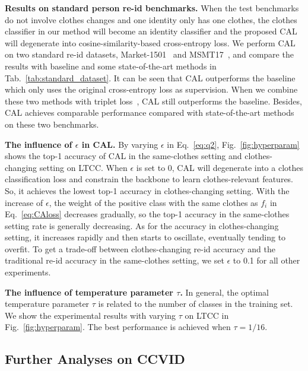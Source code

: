 \documentclass[10pt,twocolumn,letterpaper]{article}
\begin{document}
\medskip
\noindent
\textbf{Results on standard person re-id benchmarks.}
When the test benchmarks do not involve clothes changes and one identity only has one clothes, the clothes classifier in our method will become an identity classifier and the proposed CAL will degenerate into cosine-similarity-based cross-entropy loss. 
We perform CAL on two standard re-id datasets, \ie Market-1501~\cite{Zheng2015Scalable} and MSMT17~\cite{MSMT17}, and compare the results with baseline and some state-of-the-art methods in Tab.~\ref{tab:standard_dataset}. 
It can be seen that CAL outperforms the baseline which only uses the original cross-entropy loss as supervision. 
When we combine these two methods with triplet loss~\cite{Hermans2017In}, CAL still outperforms the baseline.
Besides, CAL achieves comparable performance compared with state-of-the-art methods on these two benchmarks.


\medskip
\noindent
\textbf{The influence of $\epsilon$ in CAL.}
By varying $\epsilon$ in Eq.~\eqref{eq:q2}, Fig.~\ref{fig:hyperparam} shows the top-1 accuracy of CAL in the same-clothes setting and clothes-changing setting on LTCC.
When $\epsilon$ is set to 0, CAL will degenerate into a clothes classification loss and constrain the backbone to learn clothes-relevant features.
So, it achieves the lowest top-1 accuracy in clothes-changing setting.
With the increase of $\epsilon$, the weight of the positive class with the same clothes as $f_i$ in Eq.~\eqref{eq:CAloss} decreases gradually, so the top-1 accuracy in the same-clothes setting rate is generally decreasing.
As for the accuracy in clothes-changing setting, it increases rapidly and then starts to oscillate, eventually tending to overfit.
To get a trade-off between clothes-changing re-id accuracy and the traditional re-id accuracy in the same-clothes setting, we set $\epsilon$ to 0.1 for all other experiments.

\medskip
\noindent
\textbf{The influence of temperature parameter $\tau$.}
In general, the optimal temperature parameter $\tau$ is related to the number of classes in the training set.
We show the experimental results with varying $\tau$ on LTCC in Fig.~\ref{fig:hyperparam}.
The best performance is achieved when $\tau=1/16$.



\subsection{Further Analyses on CCVID}
\label{sec:exp_on_ccvid}
\end{document}
